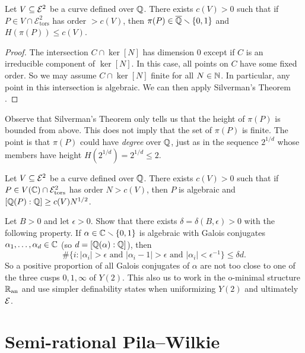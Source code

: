 \begin{theorem}
  Let $V\subseteq {\mathcal E}^2$ be a curve defined over ${\mathbb{Q}}$. There exists 
  $c(V)>0$ such that if $P\in V\cap\mathcal{E}^2_{\mathrm{tors}}$  has
  order $>c(V)$, then $\pi(P)\in {\overline{\mathbb{Q}}}\smallsetminus\{0,1\}$ and $H(\pi(P))\le c(V)$. 
\end{theorem}
\begin{proof}
  The intersection $C\cap \ker[N]$ has dimension $0$ except if $C$ is
  an irreducible component of $\ker[N]$. In this case, all points on
  $C$ have some fixed order. So we may assume $C\cap \ker[N]$ finite
  for all $N\in{\mathbb{N}}$. In particular, any point in this intersection is
  algebraic. We can then apply Silverman's Theorem \cite{Silverman}. 
\end{proof}

Observe that Silverman's Theorem only tells us that the height of
$\pi(P)$ is bounded from above. This does not imply that the set of
$\pi(P)$ is finite. The point is that  $\pi(P)$ could have
\textit{degree} over ${\mathbb{Q}}$,
just as in the sequence $2^{1/d}$ whose members have height
$H(2^{1/d})=2^{1/d}\le 2$. 


\begin{corollary}
  \label{cor:davidsilverman}
  Let $V\subseteq {\mathcal E}^2$ be a curve defined over ${\mathbb{Q}}$. There exists 
  $c(V)>0$ such that if $P\in V({\mathbb{C}})\cap\mathcal{E}^2_{\mathrm{tors}}$  has
  order $N>c(V)$, then $P$ is algebraic and 
  $[{\mathbb{Q}}(P):{\mathbb{Q}}] \ge c(V) N^{1/2}$. 
\end{corollary}

\begin{exercise}
  Let $B>0$ and  let $\epsilon > 0$. Show that there exists
  $\delta =\delta(B,\epsilon)>0$ with the following property. If
  $\alpha\in{\mathbb{C}}\smallsetminus\{0,1\}$ is algebraic with Galois conjugates
  $\alpha_1,\ldots,\alpha_d\in{\mathbb{C}}$ (so $d=[{\mathbb{Q}}(\alpha):{\mathbb{Q}}]$), then 
  \begin{equation*}
    \#\{ i : |\alpha_i|> \epsilon \text{ and
    }|\alpha_i-1|>\epsilon\text{ and }|\alpha_i|<\epsilon^{-1}\} \le
    \delta d.
  \end{equation*}
  So a positive proportion of all Galois conjugates of $\alpha$ are
  not too close to one of the three cusps $0,1,\infty$ of $Y(2)$. This
  also us to work in the o-minimal structure ${{\mathbb{R}}_{\mathrm{an}}}$ and use simpler
  definability states when uniformizing $Y(2)$ and ultimately ${\mathcal E}$. 
\end{exercise}

\section{Semi-rational Pila--Wilkie}
\label{sec:semirational}

